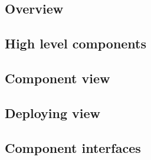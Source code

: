\subsection{Overview}


\subsection{High level components}


\subsection{Component view}


\subsection{Deploying view}


\subsection{Component interfaces}

